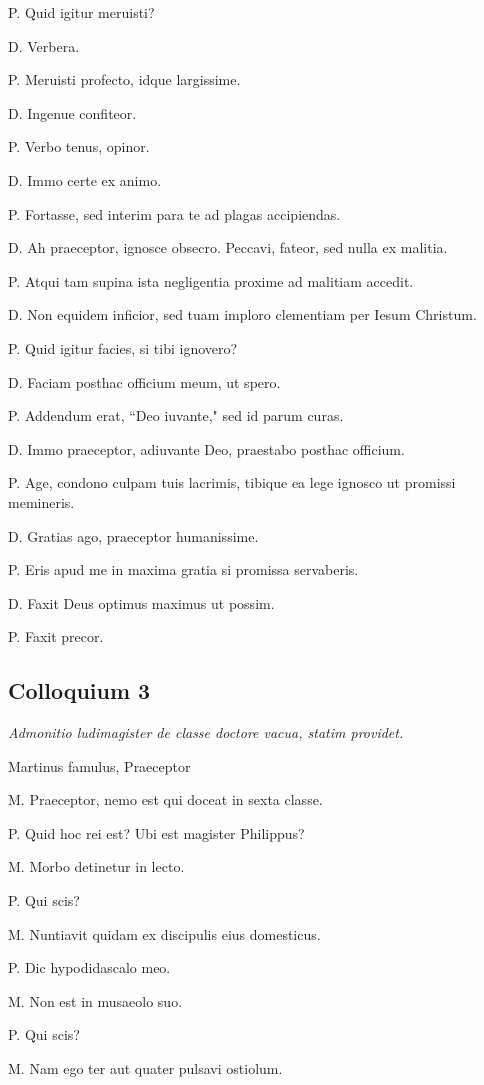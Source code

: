 \documentclass{article}
\begin{document}
P. Quid igitur meruisti?

D. Verbera.

P. Meruisti profecto, idque largissime.

D. Ingenue confiteor.

P. Verbo tenus, opinor.

D. Immo certe ex animo.

P. Fortasse, sed interim para te ad plagas accipiendas.

D. Ah praeceptor, ignosce obsecro. Peccavi, fateor, sed nulla ex malitia.

P. Atqui tam supina ista negligentia proxime ad malitiam accedit.

D. Non equidem inficior, sed tuam imploro clementiam per Iesum Christum.

P. Quid igitur facies, si tibi ignovero?

D. Faciam posthac officium meum, ut spero.

P. Addendum erat, ``Deo iuvante," sed id parum curas.

D. Immo praeceptor, adiuvante Deo, praestabo posthac officium.

P. Age, condono culpam tuis lacrimis, tibique ea lege ignosco ut promissi memineris.

D. Gratias ago, praeceptor humanissime.

P. Eris apud me in maxima gratia si promissa servaberis.

D. Faxit Deus optimus maximus ut possim.

P. Faxit precor.

\subsection{Colloquium 3}
\emph{Admonitio ludimagister de classe doctore vacua, statim providet.}

Martinus famulus, Praeceptor

M. Praeceptor, nemo est qui doceat in sexta classe.

P. Quid hoc rei est? Ubi est magister Philippus?

M. Morbo detinetur in lecto.

P. Qui scis?

M. Nuntiavit quidam ex discipulis eius domesticus.

P. Dic hypodidascalo meo.

M. Non est in musaeolo suo.

P. Qui scis?

M. Nam ego ter aut quater pulsavi ostiolum.
\end{document}
